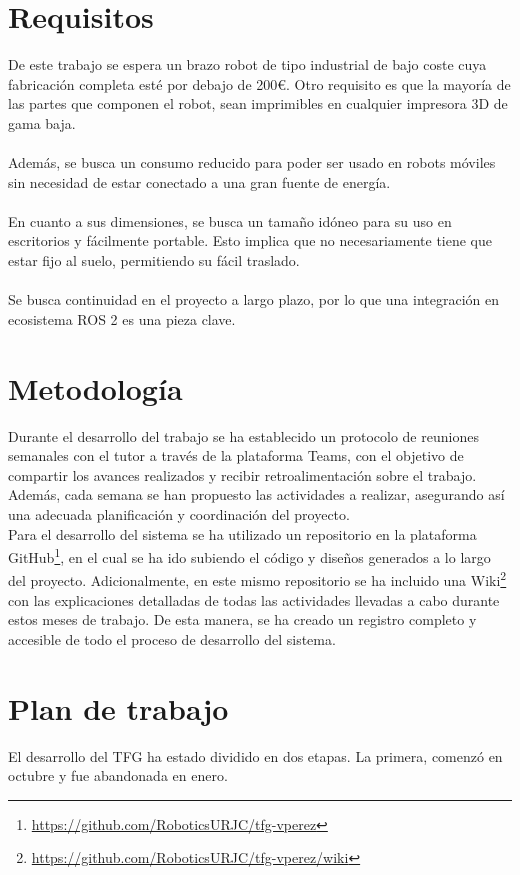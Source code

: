 \section{Requisitos}
\label{sec:requisitos}
De este trabajo se espera un brazo robot de tipo industrial de bajo coste cuya fabricación completa esté por debajo de 200\euro.
Otro requisito es que la mayoría de las partes que componen el robot, sean imprimibles en cualquier impresora 3D de gama baja.\\\\
Además, se busca un consumo reducido para poder ser usado en robots móviles sin necesidad de estar conectado a una gran fuente de 
energía.\\\\
En cuanto a sus dimensiones, se busca un tamaño idóneo para su uso en escritorios y fácilmente portable. Esto implica que no necesariamente 
tiene que estar fijo al suelo, permitiendo su fácil traslado.\\\\
Se busca continuidad en el proyecto a largo plazo, por lo que una integración en ecosistema \acs{ROS} 2 es una pieza clave. 

\section{Metodología}
\label{sec:metodologia}

Durante el desarrollo del trabajo se ha establecido un protocolo de reuniones semanales con el tutor a 
través de la plataforma Teams, con el objetivo de compartir los avances realizados y recibir retroalimentación 
sobre el trabajo. Además, cada semana se han propuesto las actividades a realizar, asegurando así una adecuada 
planificación y coordinación del proyecto. \\
Para el desarrollo del sistema se ha utilizado un repositorio en la plataforma GitHub\footnote{\url{https://github.com/RoboticsURJC/tfg-vperez}}, en el cual se ha ido
subiendo el código y diseños generados a lo largo del proyecto. Adicionalmente, en este mismo repositorio 
se ha incluido una Wiki\footnote{\url{https://github.com/RoboticsURJC/tfg-vperez/wiki}} con las explicaciones detalladas de todas las actividades llevadas a cabo durante estos 
meses de trabajo. De esta manera, se ha creado un registro completo y accesible de todo el proceso de desarrollo del sistema.

\section{Plan de trabajo}
\label{sec:plantrabajo}
El desarrollo del TFG ha estado dividido en dos etapas. La primera, comenzó en octubre y fue abandonada en enero. 
